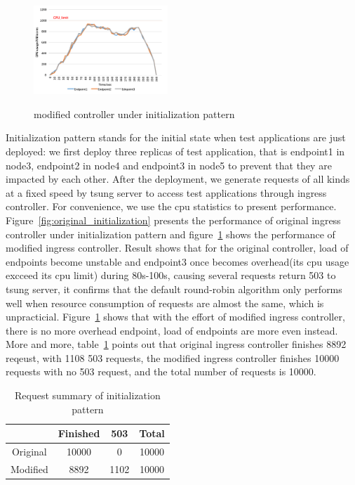\begin{figure}[!htb]
  \centering
  \includegraphics[width=0.45\textwidth]{images/data2.png}\\
  \caption{modified controller under initialization pattern}
  \label{fig:modified_initialization}
\end{figure}

Initialization pattern stands for the initial state when test applications are just deployed: we first deploy three replicas of test application, that is endpoint1 in node3, endpoint2 in node4 and endpoint3 in node5
to prevent that they are impacted by each other. After the deployment, we generate requests of all kinds at a fixed speed by tsung server to access test applications through ingress controller.
For convenience, we use the cpu statistics to present performance. Figure~\ref{fig:original_initialization} presents the performance of original ingress controller under initialization pattern and
figure~{\ref{fig:modified_initialization}} shows the performance of modified ingress controller. Result shows that for the original controller, load of endpoints become unstable and endpoint3 once becomes overhead(its cpu usage excceed its cpu limit) during 80s-100s, causing several
requests return 503 to tsung server, it confirms that the default round-robin algorithm only performs well when resource consumption of requests are almost the same, which is unpracticial. Figure~{\ref{fig:modified_initialization}} shows that
with the effort of modified ingress controller, there is no more overhead endpoint, load of endpoints are more even instead. More and more, table~{\ref{table:request_summary1}} points out that original ingress controller finishes 8892 reqeust, with 1108 503 requests, the
modified ingress controller finishes 10000 requests with no 503 request, and the total number of requests is 10000.
\hspace{0pt}
\begin{table}[htbp]
 \begin{center}
  \begin{tabular}{c|c|c|c}
   \hline
              & Finished    & 503   & Total  \\  \hline
   Original           & 10000   & 0   & 10000 \\ \hline
   Modified      & 8892     & 1102    & 10000    \\ \hline
  \end{tabular}
 \end{center}
 \caption{Request summary of initialization pattern}
 \label{table:request_summary1}
\end{table}

